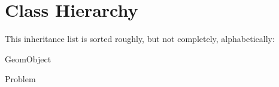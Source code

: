 \section{Class Hierarchy}
This inheritance list is sorted roughly, but not completely, alphabetically\+:\begin{DoxyCompactList}
\item Geom\+Object\begin{DoxyCompactList}
\item {}
\end{DoxyCompactList}
\item Problem\begin{DoxyCompactList}
\item {}
\item {}
\end{DoxyCompactList}
\end{DoxyCompactList}
